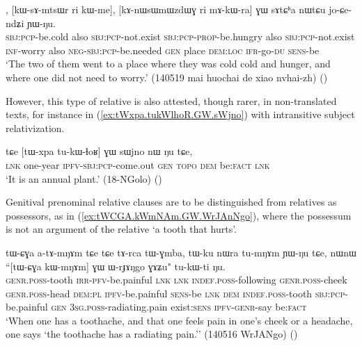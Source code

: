 \begin{exe}
\ex \label{ex:makWra.GW.sAtCha}
\gll [kɯ-ɣɤndʐo ri kɯ-me], [kɯ-sɤ-mtsɯr ri kɯ-me], [kɤ-nɯsɯmɯzdɯɣ ri mɤ-kɯ-ra] ɣɯ sɤtɕʰa nɯtɕu jo-ɕe-ndʑi ɲɯ-ŋu. \\
\textsc{sbj}:\textsc{pcp}-be.cold also \textsc{sbj}:\textsc{pcp}-not.exist \textsc{sbj}:\textsc{pcp}-\textsc{prop}-be.hungry also \textsc{sbj}:\textsc{pcp}-not.exist \textsc{inf}-worry also \textsc{neg}-\textsc{sbj}:\textsc{pcp}-be.needed \textsc{gen} place \textsc{dem}:\textsc{loc} \textsc{ifr}-go-\textsc{du} \textsc{sens}-be \\
\glt  `The two of them went to a place where they was cold cold and hunger, and where one did not need to worry.' (140519 mai huochai de xiao nvhai-zh)
()
\end{exe}

However, this type of relative is also attested, though rarer, in non-translated texts, for instance in (\ref{ex:tWxpa.tukWlhoR.GW.sWjno}) with intransitive subject relativization.
 

\begin{exe}
\ex \label{ex:tWxpa.tukWlhoR.GW.sWjno}
\gll  tɕe [tɯ-xpa tu-kɯ-ɬoʁ] ɣɯ sɯjno nɯ ŋu tɕe, \\
\textsc{lnk} one-year \textsc{ipfv}-\textsc{sbj}:\textsc{pcp}-come.out \textsc{gen}  \textsc{topo} \textsc{dem} be:\textsc{fact} \textsc{lnk} \\
\glt  `It is an annual plant.' (18-NGolo)
()
\end{exe}

Genitival prenominal relative clauses are to be distinguished from relatives as possessors, as in (\ref{ex:tWCGA.kWmNAm.GW.WrJAnNgo}), where the possessum   is not an argument of the relative  `a tooth that hurts'. 

\begin{exe}
\ex \label{ex:tWCGA.kWmNAm.GW.WrJAnNgo}
\gll tɯ-ɕɣa a-tɤ-mŋɤm tɕe tɕe tɤ-rca tɯ-ɣmba, tɯ-ku nɯra tu-mŋɤm ɲɯ-ŋu tɕe,  nɯnɯ ``[tɯ-ɕɣa kɯ-mŋɤm] ɣɯ ɯ-rɟɤŋgo ɣɤʑu" tu-kɯ-ti ŋu. \\
\textsc{genr}.\textsc{poss}-tooth \textsc{irr}-\textsc{pfv}-be.painful \textsc{lnk} \textsc{lnk} \textsc{indef}.\textsc{poss}-following \textsc{genr}.\textsc{poss}-cheek \textsc{genr}.\textsc{poss}-head \textsc{dem}:\textsc{pl} \textsc{ipfv}-be.painful \textsc{sens}-be \textsc{lnk} \textsc{dem} \textsc{indef}.\textsc{poss}-tooth \textsc{sbj}:\textsc{pcp}-be.painful \textsc{gen} \textsc{3sg}.\textsc{poss}-radiating.pain exist:\textsc{sens} \textsc{ipfv}-\textsc{genr}-say be:\textsc{fact} \\
\glt `When one has a toothache, and that one feels pain in one's cheek or a headache, one says `the toothache has a radiating pain.'' (140516 WrJANgo)
()
\end{exe}


